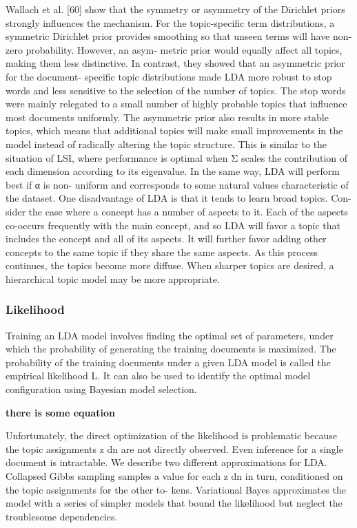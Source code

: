 Wallach et al. [60] show that the symmetry or asymmetry of the
Dirichlet priors strongly influences the mechanism. For the topic-specific
term distributions, a symmetric Dirichlet prior provides smoothing so
that unseen terms will have non-zero probability. However, an asym-
metric prior would equally affect all topics, making them less distinctive.
In contrast, they showed that an asymmetric prior for the document-
specific topic distributions made LDA more robust to stop words and
less sensitive to the selection of the number of topics. The stop words
were mainly relegated to a small number of highly probable topics that
influence most documents uniformly. The asymmetric prior also results
in more stable topics, which means that additional topics will make
small improvements in the model instead of radically altering the topic
structure. This is similar to the situation of LSI, where performance
is optimal when Σ scales the contribution of each dimension according
to its eigenvalue. In the same way, LDA will perform best if α is non-
uniform and corresponds to some natural values characteristic of the
dataset.
One disadvantage of LDA is that it tends to learn broad topics. Con-
sider the case where a concept has a number of aspects to it. Each of
the aspects co-occurs frequently with the main concept, and so LDA
will favor a topic that includes the concept and all of its aspects. It will
further favor adding other concepts to the same topic if they share the
same aspects. As this process continues, the topics become more diffuse.
When sharper topics are desired, a hierarchical topic model may be more
appropriate.

\subsubsection{Likelihood} Training an LDA model involves finding the optimal
set of parameters, under which the probability of generating the training
documents is maximized. The probability of the training documents
under a given LDA model is called the empirical likelihood L. It can
also be used to identify the optimal model configuration using Bayesian
model selection.

\textbf{there is some equation}

Unfortunately, the direct optimization of the likelihood is problematic because the topic assignments z dn are not directly observed. Even inference for a single document is intractable. We describe two different
approximations for LDA. Collapsed Gibbs sampling samples a value for
each z dn in turn, conditioned on the topic assignments for the other to-
kens. Variational Bayes approximates the model with a series of simpler
models that bound the likelihood but neglect the troublesome dependencies.



